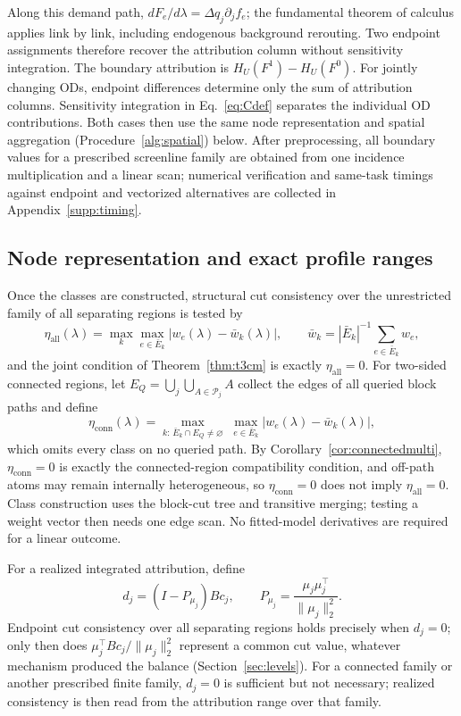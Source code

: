 \documentclass[a4paper,fleqn]{cas-sc}
\newcommand{\norm}[1]{\lVert #1 \rVert}
\begin{document}
Along this demand path, $dF_e/d\lambda=\Delta q_j\partial_jf_e$; the fundamental theorem of calculus applies link by link, including endogenous background rerouting. Two endpoint assignments therefore recover the attribution column without sensitivity integration. The boundary attribution is $H_U(F^1)-H_U(F^0)$.
For jointly changing ODs, endpoint differences determine only the sum of attribution columns. Sensitivity integration in Eq.~\eqref{eq:Cdef} separates the individual OD contributions. Both cases then use the same node representation and spatial aggregation (Procedure~\ref{alg:spatial}) below. After preprocessing, all boundary values for a prescribed screenline family are obtained from one incidence multiplication and a linear scan; numerical verification and same-task timings against endpoint and vectorized alternatives are collected in Appendix~\ref{supp:timing}.
\subsection{Node representation and exact profile ranges}
Once the classes are constructed, structural cut consistency over the
unrestricted family of all separating regions is tested by
\begin{equation}
\eta_{\mathrm{all}}(\lambda)=\max_k\max_{e\in\bar E_k}|w_e(\lambda)-\bar w_k(\lambda)|,
\qquad
\bar w_k=|\bar E_k|^{-1}\sum_{e\in\bar E_k}w_e,
\label{eq:etaall}
\end{equation}
and the joint condition of Theorem~\ref{thm:t3cm} is exactly
$\eta_{\mathrm{all}}=0$. For two-sided connected regions, let
$E_Q=\bigcup_j\bigcup_{A\in\mathcal P_j}A$ collect the edges of all queried
block paths and define
\begin{equation}
\eta_{\mathrm{conn}}(\lambda)=
\max_{k:\,\bar E_k\cap E_Q\neq\varnothing}\;
\max_{e\in\bar E_k}|w_e(\lambda)-\bar w_k(\lambda)|,
\label{eq:etaconn}
\end{equation}
which omits every class on no queried path. By
Corollary~\ref{cor:connectedmulti}, $\eta_{\mathrm{conn}}=0$ is exactly the
connected-region compatibility condition, and off-path atoms may remain
internally heterogeneous, so $\eta_{\mathrm{conn}}=0$ does not imply
$\eta_{\mathrm{all}}=0$. Class construction uses the
block-cut tree and transitive merging; testing a weight vector then needs
one edge scan. No fitted-model derivatives are required for a linear outcome.

For a realized integrated attribution, define
\begin{equation}
d_j=(I-P_{\mu_j})Bc_j,\qquad
P_{\mu_j}=\frac{\mu_j\mu_j^\top}{\norm{\mu_j}_2^2}.
\label{eq:endpointd}
\end{equation}
Endpoint cut consistency over all separating regions holds precisely when
$d_j=0$; only then does
$\mu_j^\top Bc_j/\norm{\mu_j}_2^2$ represent a common cut
value, whatever mechanism produced the balance
(Section~\ref{sec:levels}). For a connected family or another prescribed
finite family, $d_j=0$ is sufficient but not necessary; realized
consistency is then read from the attribution range over that family.
\end{document}
